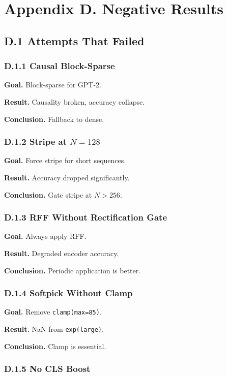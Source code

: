 \section{Appendix D. Negative Results}

\subsection{D.1 Attempts That Failed}

\subsubsection{D.1.1 Causal Block-Sparse}

\textbf{Goal.} Block-sparse for GPT-2.

\textbf{Result.} Causality broken, accuracy collapse.

\textbf{Conclusion.} Fallback to dense.

\subsubsection{D.1.2 Stripe at $N=128$}

\textbf{Goal.} Force stripe for short sequences.

\textbf{Result.} Accuracy dropped significantly.

\textbf{Conclusion.} Gate stripe at $N > 256$.

\subsubsection{D.1.3 RFF Without Rectification Gate}

\textbf{Goal.} Always apply RFF.

\textbf{Result.} Degraded encoder accuracy.

\textbf{Conclusion.} Periodic application is better.

\subsubsection{D.1.4 Softpick Without Clamp}

\textbf{Goal.} Remove \texttt{clamp(max=85)}.

\textbf{Result.} NaN from \texttt{exp(large)}.

\textbf{Conclusion.} Clamp is essential.

\subsubsection{D.1.5 No CLS Boost}

